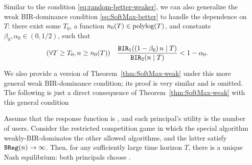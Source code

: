 Similar to the condition \eqref{eq:random-better-weaker}, we can also
generalize the weak BIR-dominance condition \eqref{eq:SoftMax-better}
to handle the dependence on $T$: there exist some $T_0$, a function
$n_0(T)\in \polylog(T)$, and constants $\beta_0,\alpha_0\in (0, 1/2)$, such that 
\begin{align}\label{eq:SoftMax-better-weaker}
(\forall T\geq T_0,  n\geq n_0(T)) \quad
\frac{\mathtt{BIR}_1((1-\beta_0)\, n\mid T)}{\mathtt{BIR}_2(n\mid T)} <1-\alpha_0.
\end{align}

We also provide a version of Theorem~\ref{thm:SoftMax-weak} under this
more general weak BIR-dominance condition; its proof is very similar
and is omitted. The following is just a direct consequence of
Theorem~\ref{thm:SoftMax-weak} with this general condition



\begin{corollary}\label{cor:SoftMax-strong}
Assume that the response function is \SoftMaxRandom, and each principal's  utility is the number of users. Consider the restricted competition game in which the special algorithm \alg weakly-BIR-dominates the other allowed algorithms, and the latter satisfy $\mathtt{BReg}(n)\to \infty$. Then, for any sufficiently large time horizon $T$, there is a unique Nash equilibrium: both principals choose \alg.
\end{corollary}



